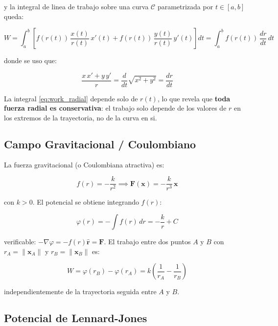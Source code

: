 \documentclass[12pt,a4paper]{article}
\begin{document}
y la integral de linea de trabajo sobre una curva $\mathcal{C}$
parametrizada por $t \in [a,b]$ queda:

\begin{equation}
    W = \int_a^b \left[
        f(r(t))\,\frac{x(t)}{r(t)}\,x'(t)
      + f(r(t))\,\frac{y(t)}{r(t)}\,y'(t)
    \right] dt
    = \int_a^b f(r(t))\,\frac{d r}{d t}\, dt
    \label{eq:work_radial}
\end{equation}

donde se uso que:

\begin{equation}
    \frac{x\,x' + y\,y'}{r} = \frac{d}{dt}\sqrt{x^2+y^2} = \frac{dr}{dt}
\end{equation}

La integral \eqref{eq:work_radial} depende solo de $r(t)$, lo que revela
que \textbf{toda fuerza radial es conservativa}: el trabajo solo depende
de los valores de $r$ en los extremos de la trayectoria, no de la curva
en si.

\subsection{Campo Gravitacional / Coulombiano}

La fuerza gravitacional (o Coulombiana atractiva) es:

\begin{equation}
    f(r) = -\frac{k}{r^2}
    \implies
    \mathbf{F}(\mathbf{x}) = -\frac{k}{r^3}\,\mathbf{x}
\end{equation}

con $k > 0$. El potencial se obtiene integrando $f(r)$:

\begin{equation}
    \varphi(r) = -\int f(r)\,dr = -\frac{k}{r} + C
\end{equation}

verificable: $-\nabla\varphi = -f(r)\hat{\mathbf{r}} = \mathbf{F}$.
El trabajo entre dos puntos $A$ y $B$ con $r_A = \|\mathbf{x}_A\|$ y
$r_B = \|\mathbf{x}_B\|$ es:

\begin{equation}
\boxed{
    W = \varphi(r_B) - \varphi(r_A) = k\left(\frac{1}{r_A} - \frac{1}{r_B}\right)
}
\label{eq:work_gravity}
\end{equation}

independientemente de la trayectoria seguida entre $A$ y $B$.

\subsection{Potencial de Lennard-Jones}
\end{document}
